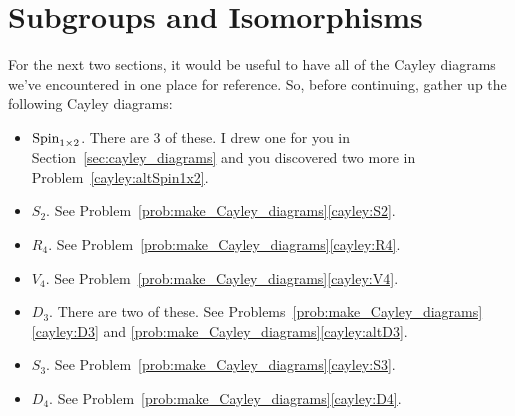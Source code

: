 \chapter{Subgroups and Isomorphisms}
\label{chapter:subgroups_isomorphisms}

For the next two sections, it would be useful to have all of the Cayley diagrams we've encountered in one place for reference. So, before continuing, gather up the following Cayley diagrams:
\begin{itemize}
\item $\operatorname{Spin}_{1\times 2}$. There are 3 of these.  I drew one for you in Section~\ref{sec:cayley_diagrams} and you discovered two more in Problem~\ref{cayley:altSpin1x2}.
\item $S_2$.  See Problem~\ref{prob:make_Cayley_diagrams}\ref{cayley:S2}.
\item $R_4$.  See Problem~\ref{prob:make_Cayley_diagrams}\ref{cayley:R4}.
\item $V_4$.  See Problem~\ref{prob:make_Cayley_diagrams}\ref{cayley:V4}.
\item $D_3$.  There are two of these.  See Problems~\ref{prob:make_Cayley_diagrams}\ref{cayley:D3} and \ref{prob:make_Cayley_diagrams}\ref{cayley:altD3}.
\item $S_3$.  See Problem~\ref{prob:make_Cayley_diagrams}\ref{cayley:S3}.
\item $D_4$.  See Problem~\ref{prob:make_Cayley_diagrams}\ref{cayley:D4}.
\end{itemize}


